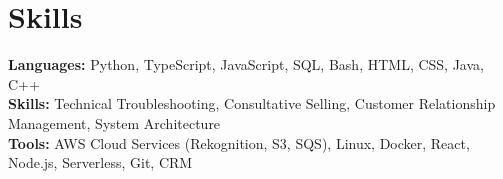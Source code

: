 \documentclass[11pt]{article}       %
\begin{document}

\vspace{-18.5pt}

\section*{Skills}
\textbf{Languages:} Python, TypeScript, JavaScript, SQL, Bash, HTML, CSS, Java, C++\\
\textbf{Skills:} Technical Troubleshooting, Consultative Selling, Customer Relationship Management, System Architecture\\
\textbf{Tools:} AWS Cloud Services (Rekognition, S3, SQS), Linux, Docker, React, Node.js, Serverless, Git, CRM\\

\vspace{-6.5pt}
\end{document}
